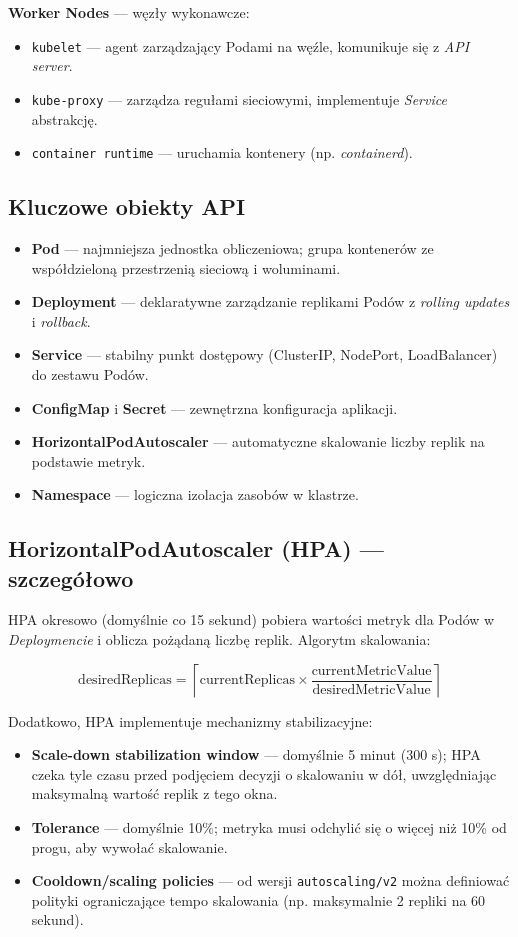 \textbf{Worker Nodes} — węzły wykonawcze:
\begin{itemize}
  \item \texttt{kubelet} — agent zarządzający Podami na węźle, komunikuje się z \textit{API server}.
  \item \texttt{kube-proxy} — zarządza regułami sieciowymi, implementuje \textit{Service} abstrakcję.
  \item \texttt{container runtime} — uruchamia kontenery (np. \textit{containerd}).
\end{itemize}

\subsection{Kluczowe obiekty API}

\begin{itemize}
  \item \textbf{Pod} — najmniejsza jednostka obliczeniowa; grupa kontenerów ze współdzieloną przestrzenią sieciową i woluminami.
  \item \textbf{Deployment} — deklaratywne zarządzanie replikami Podów z \textit{rolling updates} i \textit{rollback}.
  \item \textbf{Service} — stabilny punkt dostępowy (ClusterIP, NodePort, LoadBalancer) do zestawu Podów.
  \item \textbf{ConfigMap} i \textbf{Secret} — zewnętrzna konfiguracja aplikacji.
  \item \textbf{HorizontalPodAutoscaler} — automatyczne skalowanie liczby replik na podstawie metryk.
  \item \textbf{Namespace} — logiczna izolacja zasobów w klastrze.
\end{itemize}

\subsection{HorizontalPodAutoscaler (HPA) — szczegółowo}

HPA okresowo (domyślnie co 15 sekund) pobiera wartości metryk dla Podów w \textit{Deploymencie} i oblicza pożądaną liczbę replik. Algorytm skalowania:

\begin{equation}
  \text{desiredReplicas} = \left\lceil \text{currentReplicas} \times \frac{\text{currentMetricValue}}{\text{desiredMetricValue}} \right\rceil
\end{equation}

Dodatkowo, HPA implementuje mechanizmy stabilizacyjne:
\begin{itemize}
  \item \textbf{Scale-down stabilization window} — domyślnie 5 minut (300 s); HPA czeka tyle czasu przed podjęciem decyzji o skalowaniu w dół, uwzględniając maksymalną wartość replik z tego okna.
  \item \textbf{Tolerance} — domyślnie 10\%; metryka musi odchylić się o więcej niż 10\% od progu, aby wywołać skalowanie.
  \item \textbf{Cooldown/scaling policies} — od wersji \texttt{autoscaling/v2} można definiować polityki ograniczające tempo skalowania (np. maksymalnie 2 repliki na 60 sekund).
\end{itemize}

